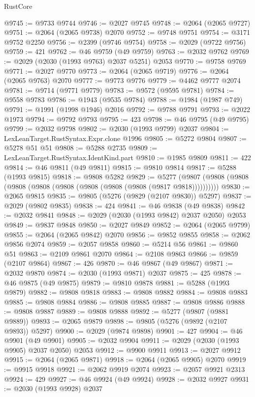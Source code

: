 \begin{lexlean}{RustCore}
\begin{coremodule}
@9745 := @9733 @9744
@9746 := @2027 @9745
@9748 := @2064 (@2065 @9727)
@9751 := @2064 (@2065 @9738) @2070
@9752 := @9748 @9751
@9754 := @3171 @9752 @2250
@9756 := @2399 (@9746 @9754)
@9758 := @2029 (@9722 @9756)
@9759 := 421
@9762 := @46 @9759 (@49 @9759)
@9763 := @2032 @9762
@9769 := @2029 (@2030 (@1993 @9763) @2037 @5251) @2053
@9770 := @9758 @9769
@9771 := @2027 @9770
@9773 := @2064 (@2065 @9719)
@9776 := @2064 (@2065 @9763) @2070
@9777 := @9773 @9776
@9779 := @4462 @9777 @2074
@9781 := @9714 (@9771 @9779)
@9783 := @9572 (@9595 @9781)
@9784 := @9558 @9783
@9786 := @1943 (@9535 @9784)
@9788 := @1984 (@1987 @749)
@9791 := @1991 (@1998 @1946) @2016
@9792 := @9788 @9791
@9793 := @2022 @1973
@9794 := @9792 @9793
@9795 := 423
@9798 := @46 @9795 (@49 @9795)
@9799 := @2032 @9798
@9802 := @2030 (@1993 @9799) @2037
@9804 := LexLeanTarget.RustSyntax.Expr.clone @1996
@9805 := @5272 @9804
@9807 := @5278 @51 @51
@9808 := @5288 @2735
@9809 := LexLeanTarget.RustSyntax.IdentKind.part
@9810 := @1985 @9809
@9811 := 422
@9814 := @46 @9811 (@49 @9811)
@9815 := @9810 @9814
@9817 := @5288 (@1993 @9815)
@9818 := @9808 @5282
@9829 := @5277 (@9807 (@9808 (@9808 (@9808 (@9808 (@9808 (@9808 (@9808 (@9808 (@9817 @9818))))))))))
@9830 := @2065 @9815
@9835 := @9805 (@5276 (@9829 (@2107 @9830)) @5297)
@9837 := @2029 (@9802 @9835)
@9838 := 424
@9841 := @46 @9838 (@49 @9838)
@9842 := @2032 @9841
@9848 := @2029 (@2030 (@1993 @9842) @2037 @2050) @2053
@9849 := @9837 @9848
@9850 := @2027 @9849
@9852 := @2064 (@2065 @9799)
@9855 := @2064 (@2065 @9842) @2070
@9856 := @9852 @9855
@9858 := @2062 @9856 @2074
@9859 := @2057 @9858
@9860 := @5214 @56
@9861 := @9860 @51
@9863 := @2109 @9861 @2070
@9864 := @2108 @9863
@9866 := @9859 (@2107 @9864)
@9867 := 426
@9870 := @46 @9867 (@49 @9867)
@9871 := @2032 @9870
@9874 := @2030 (@1993 @9871) @2037
@9875 := 425
@9878 := @46 @9875 (@49 @9875)
@9879 := @9810 @9878
@9881 := @5288 (@1993 @9879)
@9882 := @9808 @9818
@9883 := @9808 @9882
@9884 := @9808 @9883
@9885 := @9808 @9884
@9886 := @9808 @9885
@9887 := @9808 @9886
@9888 := @9808 @9887
@9889 := @9808 @9888
@9892 := @5277 (@9807 (@9881 @9889))
@9893 := @2065 @9879
@9898 := @9805 (@5276 (@9892 (@2107 @9893)) @5297)
@9900 := @2029 (@9874 @9898)
@9901 := 427
@9904 := @46 @9901 (@49 @9901)
@9905 := @2032 @9904
@9911 := @2029 (@2030 (@1993 @9905) @2037 @2050) @2053
@9912 := @9900 @9911
@9913 := @2027 @9912
@9915 := @2064 (@2065 @9871)
@9918 := @2064 (@2065 @9905) @2070
@9919 := @9915 @9918
@9921 := @2062 @9919 @2074
@9923 := @2057 @9921 @2313
@9924 := 429
@9927 := @46 @9924 (@49 @9924)
@9928 := @2032 @9927
@9931 := @2030 (@1993 @9928) @2037

\end{coremodule}
\end{lexlean}
